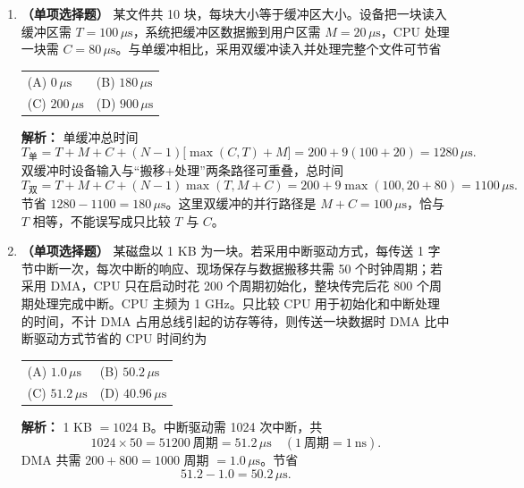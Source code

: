 \begin{enumerate}[resume]

\item \textbf{（单项选择题）} 某文件共 10 块，每块大小等于缓冲区大小。设备把一块读入缓冲区需 $T=100\,\mu\text{s}$，系统把缓冲区数据搬到用户区需 $M=20\,\mu\text{s}$，CPU 处理一块需 $C=80\,\mu\text{s}$。与单缓冲相比，采用双缓冲读入并处理完整个文件可节省
\begin{center}
\begin{tabular}{ll}
(A) $0\,\mu\text{s}$ & (B) $180\,\mu\text{s}$ \\[4pt]
(C) $200\,\mu\text{s}$ & (D) $900\,\mu\text{s}$
\end{tabular}
\end{center}

\ifshowsolutions\par\noindent\textbf{解析：} 单缓冲总时间
\[
T_{\text{单}}=T+M+C+(N-1)\bigl[\max(C,T)+M\bigr]
=200+9(100+20)=1280\,\mu\text{s}.
\]
双缓冲时设备输入与“搬移+处理”两条路径可重叠，总时间
\[
T_{\text{双}}=T+M+C+(N-1)\max(T,M+C)
=200+9\max(100,20+80)=1100\,\mu\text{s}.
\]
节省 $1280-1100=180\,\mu\text{s}$。这里双缓冲的并行路径是 $M+C=100\,\mu\text{s}$，恰与 $T$ 相等，不能误写成只比较 $T$ 与 $C$。\else \answerarea \fi

\vspace{8pt}

\item \textbf{（单项选择题）} 某磁盘以 1 KB 为一块。若采用中断驱动方式，每传送 1 字节中断一次，每次中断的响应、现场保存与数据搬移共需 50 个时钟周期；若采用 DMA，CPU 只在启动时花 200 个周期初始化，整块传完后花 800 个周期处理完成中断。CPU 主频为 1 GHz。只比较 CPU 用于初始化和中断处理的时间，不计 DMA 占用总线引起的访存等待，则传送一块数据时 DMA 比中断驱动方式节省的 CPU 时间约为
\begin{center}
\begin{tabular}{ll}
(A) $1.0\,\mu\text{s}$ & (B) $50.2\,\mu\text{s}$ \\[4pt]
(C) $51.2\,\mu\text{s}$ & (D) $40.96\,\mu\text{s}$
\end{tabular}
\end{center}

\ifshowsolutions\par\noindent\textbf{解析：} 1 KB $=1024$ B。中断驱动需 1024 次中断，共
\[
1024\times 50=51200\ \text{周期}=51.2\,\mu\text{s}\quad(1\ \text{周期}=1\ \text{ns}).
\]
DMA 共需 $200+800=1000$ 周期 $=1.0\,\mu\text{s}$。节省
\[
51.2-1.0=50.2\,\mu\text{s}.
\]
\else \answerarea \fi


\end{enumerate}
